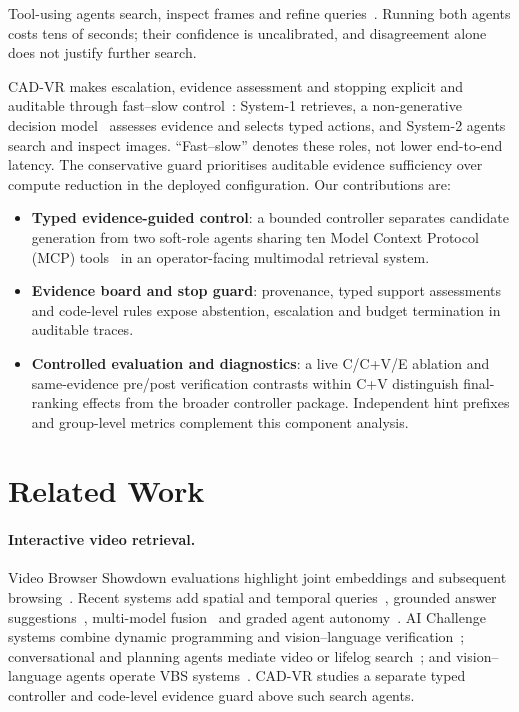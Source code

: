 \documentclass[runningheads]{llncs}
\begin{document}
Tool-using agents search, inspect frames and refine queries~\cite{videoagent2024,dvd2025,videomind2026,lenswalk2026}. Running both agents costs tens of seconds; their confidence is uncalibrated, and disagreement alone does not justify further search.

CAD-VR makes escalation, evidence assessment and stopping explicit and auditable through fast--slow control~\cite{kahneman2011,swiftsage2023}: System-1 retrieves, a non-generative decision model~\cite{jev2026} assesses evidence and selects typed actions, and System-2 agents search and inspect images. ``Fast--slow'' denotes these roles, not lower end-to-end latency. The conservative guard prioritises auditable evidence sufficiency over compute reduction in the deployed configuration. Our contributions are:
\begin{itemize}
\item \textbf{Typed evidence-guided control}: a bounded controller separates candidate generation from two soft-role agents sharing ten Model Context Protocol (MCP) tools~\cite{mcp2024} in an operator-facing multimodal retrieval system.
\item \textbf{Evidence board and stop guard}: provenance, typed support assessments and code-level rules expose abstention, escalation and budget termination in auditable traces.
\item \textbf{Controlled evaluation and diagnostics}: a live C/C+V/E ablation and same-evidence pre/post verification contrasts within C+V distinguish final-ranking effects from the broader controller package. Independent hint prefixes and group-level metrics complement this component analysis.
\end{itemize}

\section{Related Work}
\label{sec:related}
\paragraph{Interactive video retrieval.}
Video Browser Showdown evaluations highlight joint embeddings and subsequent browsing~\cite{lokoc2023lessons,vbs2025results}. Recent systems add spatial and temporal queries~\cite{vireo2026,exquisitor2026,prak2026}, grounded answer suggestions~\cite{nii2026}, multi-model fusion~\cite{fusionista2026} and graded agent autonomy~\cite{snapmind2026}. AI Challenge systems combine dynamic programming and vision--language verification~\cite{ho2025lucifer,nguyen2025adaptivedp}; conversational and planning agents mediate video or lifelog search~\cite{nguyen2025conversational,hole2025lifelog}; and vision--language agents operate VBS systems~\cite{jackl2026agents}. CAD-VR studies a separate typed controller and code-level evidence guard above such search agents.
\end{document}
